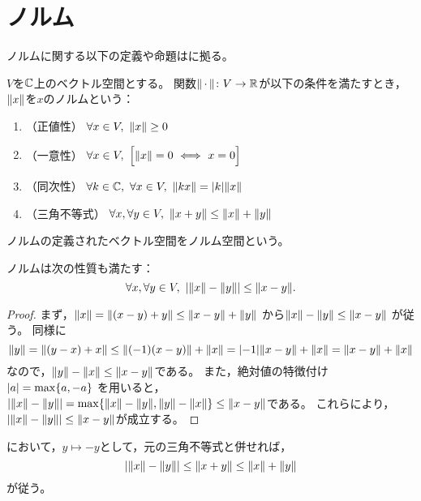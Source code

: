 \documentclass[b5paper,oneside,openany]{ltjsbook} %
\begin{document}
\ifdraft{\tableofcontents}{}
\section{ノルム}
ノルムに関する以下の定義や命題は\cite{nomura}に拠る。

\begin{defi}[ノルム]
    $V$を$\mathbb{C}$上のベクトル空間とする。
    関数$\norm{\dummy}\colon V\to \R$が以下の条件を満たすとき，$\norm{x}$を$x$のノルムという：
    \begin{enumerate}[label=(\roman*)]
        \item （正値性） $\forall x\in V,\ \norm{x}\geq 0$
        \item （一意性） $\forall x\in V,\ \bsqu{\norm{x}=0\ \Longleftrightarrow\ x=0}$
        \item （同次性） $\forall k\in \CC,\ \forall x\in V,\ \norm{kx}=\abs{k}\norm{x}$
        \item （三角不等式） $\forall x, \forall y\in V,\ \norm{x+y}\leq \norm{x}+\norm{y}$
    \end{enumerate}
    ノルムの定義されたベクトル空間をノルム空間という。
\end{defi}


\begin{prop}[三角不等式]
    ノルムは次の性質も満たす：
    \begin{equation}
        \forall x, \forall y\in V,\ \abs{\norm{x}-\norm{y}}\leq \norm{x-y}.
    \end{equation}
    \begin{proof}
        まず，$\norm{x}=\norm{\pare{x-y}+y}\leq \norm{x-y}+\norm{y}$
        から$\norm{x}-\norm{y}\leq \norm{x-y}$
        が従う。
        同様に
        \begin{equation}
            \norm{y}=\norm{\pare{y-x}+x}\leq \norm{\pare{-1}\pare{x-y}}+\norm{x}=\abs{-1}\norm{x-y}+\norm{x}=\norm{x-y}+\norm{x}
        \end{equation}
        なので，$\norm{y}-\norm{x}\leq \norm{x-y}$である。
        また，絶対値の特徴付け$\abs{a}= \max\bra{a,-a}$
        を用いると，$\abs{\norm{x}-\norm{y}}= \max\bra{\norm{x}-\norm{y},\norm{y}-\norm{x}}\leq \norm{x-y}$である。
        これらにより，$\abs{\norm{x}-\norm{y}}\leq \norm{x-y}$が成立する。
    \end{proof}
\end{prop}

\begin{cor}
    において，$y\mapsto -y$として，元の三角不等式と併せれば，
    \begin{equation}
        \abs{\norm{x}-\norm{y}}\leq \norm{x+y}\leq \norm{x}+\norm{y}
    \end{equation}
    が従う。
\end{cor}
\end{document}
